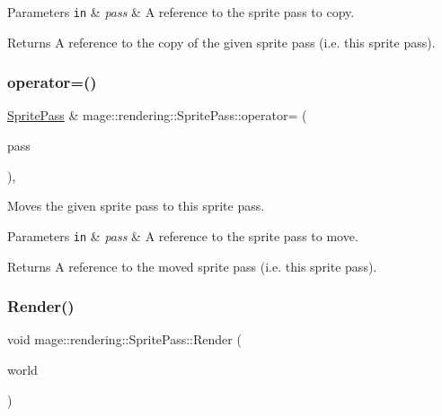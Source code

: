 \begin{DoxyParams}[1]{Parameters}
\mbox{\tt in}  & {\em pass} & A reference to the sprite pass to copy. \\
\hline
\end{DoxyParams}
\begin{DoxyReturn}{Returns}
A reference to the copy of the given sprite pass (i.\+e. this sprite pass). 
\end{DoxyReturn}
\hypertarget{classmage_1_1rendering_1_1_sprite_pass_a17566d8f281862629f095211bad18b9e}{}\label{classmage_1_1rendering_1_1_sprite_pass_a17566d8f281862629f095211bad18b9e} 
\subsubsection{\texorpdfstring{operator=()}{operator=()}\hspace{0.1cm}{\footnotesize\ttfamily [2/2]}}
{\footnotesize\ttfamily \hyperlink{classmage_1_1rendering_1_1_sprite_pass}{Sprite\+Pass} \& mage\+::rendering\+::\+Sprite\+Pass\+::operator= (\begin{DoxyParamCaption}\item[{\hyperlink{classmage_1_1rendering_1_1_sprite_pass}{Sprite\+Pass} \&\&}]{pass }\end{DoxyParamCaption})\hspace{0.3cm}{\ttfamily [default]}, {\ttfamily [noexcept]}}

Moves the given sprite pass to this sprite pass.


\begin{DoxyParams}[1]{Parameters}
\mbox{\tt in}  & {\em pass} & A reference to the sprite pass to move. \\
\hline
\end{DoxyParams}
\begin{DoxyReturn}{Returns}
A reference to the moved sprite pass (i.\+e. this sprite pass). 
\end{DoxyReturn}
\hypertarget{classmage_1_1rendering_1_1_sprite_pass_a9b4dbd8c8d0a8942976b6d0c0df7aa3d}{}\label{classmage_1_1rendering_1_1_sprite_pass_a9b4dbd8c8d0a8942976b6d0c0df7aa3d} 
\subsubsection{\texorpdfstring{Render()}{Render()}}
{\footnotesize\ttfamily void mage\+::rendering\+::\+Sprite\+Pass\+::\+Render (\begin{DoxyParamCaption}\item[{const \hyperlink{classmage_1_1rendering_1_1_world}{World} \&}]{world }\end{DoxyParamCaption})}

